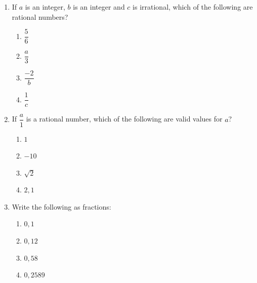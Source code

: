 \begin{exercises}{}{
\nopagebreak
\label{m38348*id63121}\begin{enumerate}[itemsep=5pt, label=\textbf{\arabic*}. ] 
\label{m38348*uid9}\item If $a$ is an integer, $b$ is an integer and $c$ is irrational, which of the following are rational numbers? 
\label{m38348*id734}\begin{enumerate}[itemsep=5pt, label=\textbf{\alph*}. ] 
\item $\dfrac{5}{6}$\newline
\item $\dfrac{a}{3}$\newline
\item $\dfrac{-2}{b}$\newline
\item $\dfrac{1}{c}$\end{enumerate}
\label{m38348*uid10}\item If $\dfrac{a}{1}$ is a rational number, which of the following are valid values for $a$?\label{m38348*id7432}\begin{enumerate}[itemsep=5pt, label=\textbf{\alph*}. ] 
\item $1$\item $-10$\item $\sqrt{2}$\item $2,1$\end{enumerate}
% 
\label{m38348*uid20}\item Write the following as fractions:\label{m38348*id7322}
\begin{enumerate}[itemsep=5pt, label=\textbf{\alph*}. ] 
\item $0,1$\item $0,12$\item $0,58$\item $0,2589$

\end{enumerate}
\end{enumerate}}
\end{exercises}

